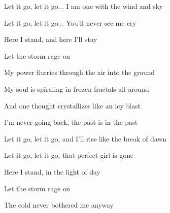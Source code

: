 \begin{song}
\bigskip

Let it go, let it go... I am one with the wind and sky \par
Let it go, let it go... You'll never see me cry \par
{}Here I stand, and here I'll stay \par
Let the storm rage on  \par

\bigskip

 My power flurries through the air into the ground \par
{} My soul is spiraling in frozen fractals all around \par
{} And one thought crystallizes like an icy blast \par
{} I'm never going back, the past is in the past   \par

\bigskip

Let it go, let it go, and I'll rise like the break of dawn \par
Let it go, let it go, that perfect girl is gone \par
{}Here I stand, in the light of day \par
{} Let the storm rage on \par
The cold never bothered me anyway \par

\end{song}